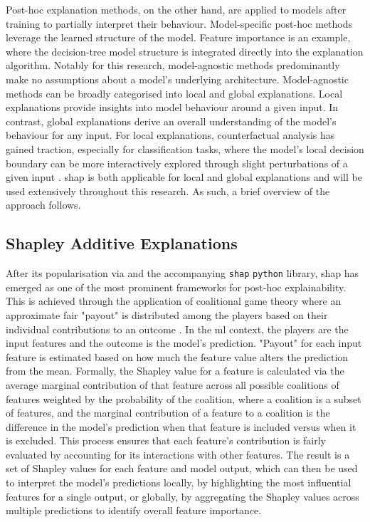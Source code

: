 Post-hoc explanation methods, on the other hand, are applied to models after training to partially interpret their behaviour. Model-specific post-hoc methods leverage the learned structure of the model. Feature importance is an example, where the decision-tree model structure is integrated directly into the explanation algorithm. Notably for this research, model-agnostic methods predominantly make no assumptions about a model's underlying architecture. Model-agnostic methods can be broadly categorised into local and global explanations. Local explanations provide insights into model behaviour around a given input. In contrast, global explanations derive an overall understanding of the model's behaviour for any input. For local explanations, counterfactual analysis has gained traction, especially for classification tasks, where the model's local decision boundary can be more interactively explored through slight perturbations of a given input \citep{Mothilal2019}. \acrfull{shap} is both applicable for local and global explanations and will be used extensively throughout this research. As such, a brief overview of the approach follows.

\subsection{Shapley Additive Explanations}

After its popularisation via \cite{Lundberg2017} and the accompanying \texttt{shap} \texttt{python} library, \acrfull{shap} has emerged as one of the most prominent frameworks for post-hoc explainability. This is achieved through the application of coalitional game theory where an approximate fair "payout" is distributed among the players based on their individual contributions to an outcome \citep{Shapley1953}. In the \acrshort{ml} context, the players are the input features and the outcome is the model's prediction. "Payout" for each input feature is estimated based on how much the feature value alters the prediction from the mean. Formally, the Shapley value for a feature is calculated via the average marginal contribution of that feature across all possible coalitions of features weighted by the probability of the coalition, where a coalition is a subset of features, and the marginal contribution of a feature to a coalition is the difference in the model's prediction when that feature is included versus when it is excluded. This process ensures that each feature's contribution is fairly evaluated by accounting for its interactions with other features. The result is a set of Shapley values for each feature and model output, which can then be used to interpret the model's predictions locally, by highlighting the most influential features for a single output, or globally, by aggregating the Shapley values across multiple predictions to identify overall feature importance.

